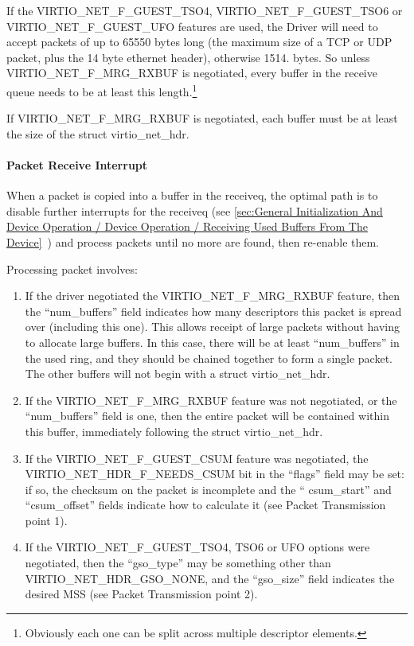 If the VIRTIO_NET_F_GUEST_TSO4, VIRTIO_NET_F_GUEST_TSO6 or
VIRTIO_NET_F_GUEST_UFO features are used, the Driver will need to
accept packets of up to 65550 bytes long (the maximum size of a
TCP or UDP packet, plus the 14 byte ethernet header), otherwise
1514. bytes. So unless VIRTIO_NET_F_MRG_RXBUF is negotiated, every
buffer in the receive queue needs to be at least this length.\footnote{Obviously each one can be split across multiple descriptor
elements.
}

If VIRTIO_NET_F_MRG_RXBUF is negotiated, each buffer must be at
least the size of the struct virtio_net_hdr.

\paragraph{Packet Receive Interrupt}\label{sec:Device Types / Network Device / Device Operation / Setting Up Receive Buffers / Packet Receive Interrupt}

When a packet is copied into a buffer in the receiveq, the
optimal path is to disable further interrupts for the receiveq
(see \ref{sec:General Initialization And Device Operation / Device Operation / Receiving Used Buffers From The Device}~) and process
packets until no more are found, then re-enable them.

Processing packet involves:

\begin{enumerate}
\item If the driver negotiated the VIRTIO_NET_F_MRG_RXBUF feature,
  then the “num_buffers” field indicates how many descriptors
  this packet is spread over (including this one). This allows
  receipt of large packets without having to allocate large
  buffers. In this case, there will be at least “num_buffers” in
  the used ring, and they should be chained together to form a
  single packet. The other buffers will not begin with a struct
  virtio_net_hdr.

\item If the VIRTIO_NET_F_MRG_RXBUF feature was not negotiated, or
  the “num_buffers” field is one, then the entire packet will be
  contained within this buffer, immediately following the struct
  virtio_net_hdr.

\item If the VIRTIO_NET_F_GUEST_CSUM feature was negotiated, the
  VIRTIO_NET_HDR_F_NEEDS_CSUM bit in the “flags” field may be
  set: if so, the checksum on the packet is incomplete and the “
  csum_start” and “csum_offset” fields indicate how to calculate
  it (see Packet Transmission point 1).

\item If the VIRTIO_NET_F_GUEST_TSO4, TSO6 or UFO options were
  negotiated, then the “gso_type” may be something other than
  VIRTIO_NET_HDR_GSO_NONE, and the “gso_size” field indicates the
  desired MSS (see Packet Transmission point 2).
\end{enumerate}

